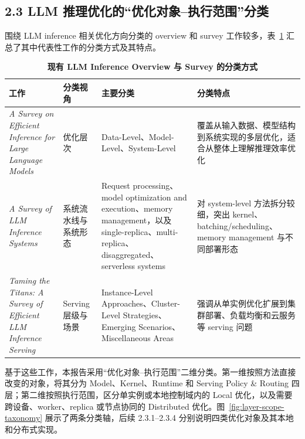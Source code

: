 \subsection*{2.3 LLM 推理优化的“优化对象--执行范围”分类}

围绕 LLM inference 相关优化方向分类的 overview 和 survey 工作较多，表~\ref{tab:existing-inference-taxonomies} 汇总了其中代表性工作的分类方式及其特点。

\begin{table}[!htbp]
    \centering
    \caption{\textbf{现有 LLM Inference Overview 与 Survey 的分类方式}}
    \label{tab:existing-inference-taxonomies}
    \renewcommand{\arraystretch}{1.4}
    \scriptsize
    \setlength{\tabcolsep}{4pt}
    \begin{tabularx}{\textwidth}{@{}>{\hsize=0.95\hsize\raggedright\arraybackslash}X >{\hsize=0.65\hsize\raggedright\arraybackslash}X >{\hsize=1.25\hsize\raggedright\arraybackslash}X >{\hsize=1.15\hsize\raggedright\arraybackslash}X@{}}
        \toprule
        \textbf{工作} & \textbf{分类视角} & \textbf{主要分类} & \textbf{分类特点} \\
        \midrule
        \textit{A Survey on Efficient Inference for Large Language Models} \cite{zhou2024survey}
        & 优化层次
        & Data-Level、Model-Level、System-Level
        & 覆盖从输入数据、模型结构到系统实现的多层优化，适合从整体上理解推理效率优化 \\
        \tabrowrule
        \textit{A Survey of LLM Inference Systems} \cite{pan2025survey}
        & 系统流水线与系统形态
        & Request processing、model optimization and execution、memory management，以及 single-replica、multi-replica、disaggregated、serverless systems
        & 对 system-level 方法拆分较细，突出 kernel、batching/scheduling、memory management 与不同部署形态 \\
        \tabrowrule
        \textit{Taming the Titans: A Survey of Efficient LLM Inference Serving} \cite{zhen2025taming}
        & Serving 层级与场景
        & Instance-Level Approaches、Cluster-Level Strategies、Emerging Scenarios、Miscellaneous Areas
        & 强调从单实例优化扩展到集群部署、负载均衡和云服务等 serving 问题 \\
        \bottomrule
    \end{tabularx}
\end{table}

基于这些工作，本报告采用“优化对象--执行范围”二维分类。第一维按照方法直接改变的对象，将其分为 Model、Kernel、Runtime 和 Serving Policy \& Routing 四层；第二维按照执行范围，区分单实例或本地控制域内的 Local 优化，以及需要跨设备、worker、replica 或节点协同的 Distributed 优化。图~\ref{fig:layer-scope-taxonomy} 展示了两条分类轴，后续 2.3.1--2.3.4 分别说明四类优化对象及其本地和分布式实现。

